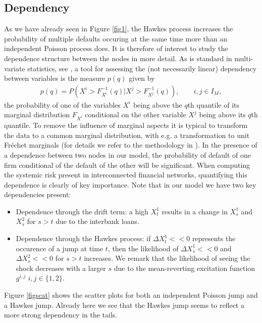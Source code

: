 \documentclass[10pt]{article}
\theoremstyle{plain}
\theoremstyle{definition}
\newcommand{\<}{\langle}
\renewcommand{\>}{\rangle}
\renewcommand{\(}{\left(}
\renewcommand{\)}{\right)}
\renewcommand{\[}{\left[}
\renewcommand{\]}{\right]}
\begin{document}
\subsection{Dependency}
As we have already seen in Figure \ref{fig1}, the Hawkes process increases the probability of
multiple defaults occuring at the same time more than an independent Poisson process does. It is
therefore of interest to study the dependence structure between the nodes in more detail. As is
standard in multi-variate statistics, see \citet{poon03}, a tool for assessing the (not necessarily
linear) dependency between variables is the measure $p(q)$ given by
\begin{align}
p(q) = P\left(X^i > F_{X^i}^{-1}(q)|X^j>F_{X^j}^{-1}(q)\right),\qquad i,j\in I_M,
\end{align}
the probability of one of the variables $X^i$ being above the $q$th quantile of its marginal distribution $F_{X^i}$ conditional on the other variable $X^j$ being above its $q$th quantile. To remove the influence of marginal aspects it is typical to transform the data to a common marginal distribution, with e.g. a transformation to unit Fr\'echet marginals (for details we refer to the methodology in \citet{poon03}). In the presence of a dependence between two nodes in our model, the probability of default of one firm conditional of the default of the other will be significant. When computing the systemic risk present in interconnected financial networks, quantifying this dependence is clearly of key importance. Note that in our model we have two key dependencies present:
\begin{itemize}
\item Dependence through the drift term: a high $X_t^1$ results in a change in $X_{s}^1$ and $X_{s}^2$ for $s>t$ due to the interbank loans.
\item Dependence through the Hawkes process: if $\Delta X_t^1<<0$ represents the occurence of a jump at time $t$, then the likelihood of $\Delta X_{s}^1<<0$ and $\Delta X_s^2<<0$ for $s>t$ increases. We remark that the likelihood of seeing the shock decreases with a larger $s$ due to the mean-reverting excitation function $g^{i,j}$ $i,j \in \{1,2\}$.
\end{itemize}
Figure \ref{figscat} shows the scatter plots for both an independent Poisson jump and a Hawkes jump. Already here we see that the Hawkes jump seems to reflect a more strong dependency in the tails.
\end{document}
